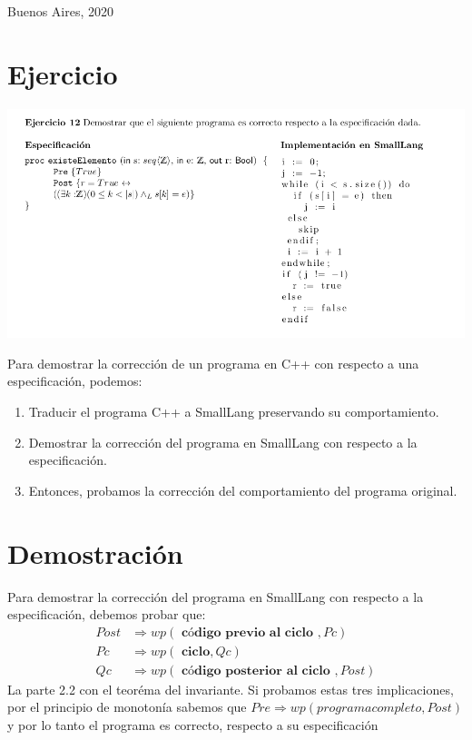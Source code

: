 \documentclass[12pt]{book}
\begin{document}
\vspace{1cm}

\noindent Buenos Aires, 2020

\newpage
\tableofcontents

\chapter{Ejercicio}
\begin{center}
\includegraphics[scale=0.55]{ejer.png}
\end {center}
Para demostrar la corrección de un programa en C++ con respecto a una especificación, podemos:
\begin{enumerate}
\item Traducir el programa C++ a SmallLang preservando su comportamiento.
\item Demostrar la corrección del programa en SmallLang con respecto a la especificación.
\item Entonces, probamos la corrección del comportamiento del programa original.
\end{enumerate}

\chapter{Demostraci\'on}
\begin{shaded}
Para demostrar la corrección del programa en SmallLang con respecto a la especificación, debemos probar que:
\begin{align}
Post &\Rightarrow wp( \textbf{ c\'odigo previo al ciclo } , Pc) \\
Pc &\Rightarrow wp (\textbf{ ciclo}, Qc ) \\
Qc & \Rightarrow wp ( \textbf{ c\'odigo posterior al ciclo }, Post) 
\end{align}
La parte 2.2 con el teor\'ema del invariante. Si probamos estas tres implicaciones, por el principio de monoton\'ia sabemos que  $ Pre \Rightarrow wp(  programa completo  , Post)  $  y por lo tanto el programa  es correcto, respecto a su especificaci\'on
\end{shaded}
\end{document}
